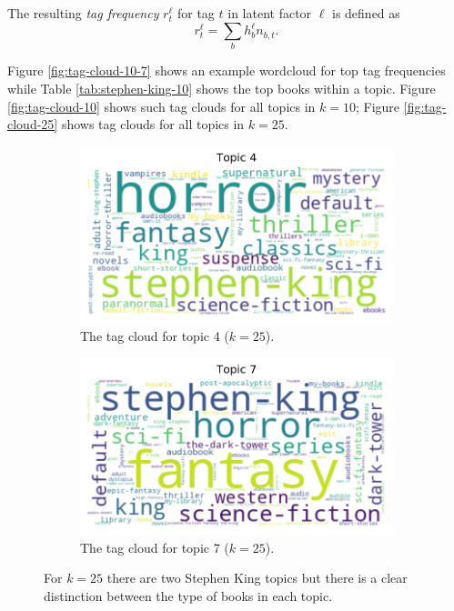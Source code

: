 \documentclass[11pt]{article}
\begin{document}
The resulting \emph{tag frequency} $r^\ell_t$ for tag $t$ in latent factor $\ell$ is defined as
\[
\displaystyle r_t^\ell = \sum_{b} h^\ell_b n_{b,t}.
\]

Figure \ref{fig:tag-cloud-10-7} shows an example wordcloud for top tag frequencies
while Table \ref{tab:stephen-king-10} shows the top books within a topic.
Figure \ref{fig:tag-cloud-10} shows such tag clouds for all topics in $k=10$;
Figure \ref{fig:tag-cloud-25} shows tag clouds for all topics in $k=25$.

\begin{figure}[b]
\centering
\begin{subfigure}[l]{0.45\linewidth}
\centering
 \includegraphics[width=\textwidth]{../image/goodreads-topics-profiles-recommendations/tag-cloud-25-wide-4.png}
 \caption[Stephen King -- Horror ($k=25$)]{The tag cloud for topic 4 ($k=25$).}
\end{subfigure}
%
\begin{subfigure}[r]{0.45\linewidth}
\centering
 \includegraphics[width=\textwidth]{../image/goodreads-topics-profiles-recommendations/tag-cloud-25-wide-7.png}
 \caption[Stephen King -- Fantasy ($k=25$)]{The tag cloud for topic 7 ($k=25$).}
\end{subfigure}
\caption[Stephen King Topics ($k=25$)]{For $k=25$ there are two Stephen King topics but there is a clear distinction between the type of books in each topic.}
\end{figure}
\end{document}
